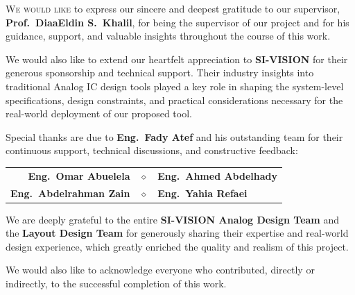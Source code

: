 \vspace{0.3cm}
\grandornament
\vspace{0.3cm}

\noindent
\lettrine[lines=3, findent=3pt, nindent=0pt]{W}{e would like} to express our sincere and deepest gratitude to our supervisor, \textbf{\color{AcademicBlue}Prof.\ DiaaEldin S.\ Khalil}, for being the supervisor of our project and for his guidance, support, and valuable insights throughout the course of this work.

\vspace{0.2cm}
\ornamentalrule
\vspace{0.2cm}
\noindent
We would also like to extend our heartfelt appreciation to \textbf{\color{AcademicBlue}SI-VISION} for their generous sponsorship and technical support. Their industry insights into traditional Analog IC design tools played a key role in shaping the system-level specifications, design constraints, and practical considerations necessary for the real-world deployment of our proposed tool.

\vspace{0.2cm}
\ornamentalrule
\vspace{0.2cm}
\noindent
\begin{tcolorbox}[
    colback=SoftCream,
    colframe=WarmGold,
    arc=4pt,
    boxrule=0.8pt,
    leftrule=4pt,
    enhanced,
    drop shadow={black!8!white},
    boxsep=10pt,
    left=10pt, right=10pt, top=8pt, bottom=8pt
]
  \noindent
  Special thanks are due to \textbf{\color{AcademicBlue}Eng.\ Fady Atef} and his outstanding team for their continuous support, technical discussions, and constructive feedback:
  
  \vspace{0.2cm}
  \begin{center}
    \sffamily\small
    \begin{tabular}{r c l}
      \textbf{\color{AcademicBlue}Eng.\ Omar Abuelela} & \quad\textcolor{WarmGold}{$\diamond$}\quad & \textbf{\color{AcademicBlue}Eng.\ Ahmed Abdelhady} \\
      \textbf{\color{AcademicBlue}Eng.\ Abdelrahman Zain} & \quad\textcolor{WarmGold}{$\diamond$}\quad & \textbf{\color{AcademicBlue}Eng.\ Yahia Refaei}
    \end{tabular}
  \end{center}
  \vspace{0.1cm}
  
  \noindent
  We are deeply grateful to the entire \textbf{\color{AcademicBlue}SI-VISION Analog Design Team} and the \textbf{\color{AcademicBlue}Layout Design Team} for generously sharing their expertise and real-world design experience, which greatly enriched the quality and realism of this project.
\end{tcolorbox}

\vspace{0.2cm}
\ornamentalrule
\vspace{0.2cm}
\noindent
We would also like to acknowledge everyone who contributed, directly or indirectly, to the successful completion of this work.


\vspace{0.5cm}

\grandornament
